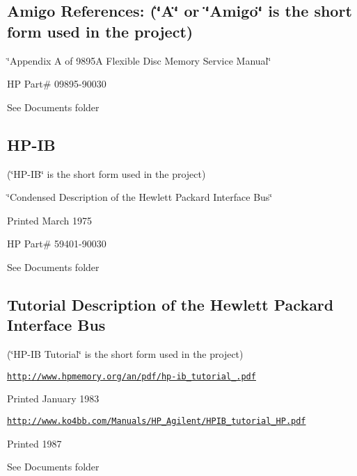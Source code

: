  \subsection*{Amigo References\+: (\char`\"{}\+A\char`\"{} or \char`\"{}\+Amigo\char`\"{} is the short form used in the project)}


\begin{DoxyItemize}
\item \char`\"{}\+Appendix A of 9895\+A Flexible Disc Memory Service Manual\char`\"{}
\item HP Part\# 09895-\/90030
\item See Documents folder
\end{DoxyItemize}



 \subsection*{H\+P-\/\+IB}


\begin{DoxyItemize}
\item (\char`\"{}\+H\+P-\/\+I\+B\char`\"{} is the short form used in the project)
\item \char`\"{}\+Condensed Description of the Hewlett Packard Interface Bus\char`\"{}
\item Printed March 1975
\item HP Part\# 59401-\/90030
\item See Documents folder
\end{DoxyItemize}



 \subsection*{Tutorial Description of the Hewlett Packard Interface Bus}


\begin{DoxyItemize}
\item (\char`\"{}\+H\+P-\/\+I\+B Tutorial\char`\"{} is the short form used in the project)
\item \href{http://www.hpmemory.org/an/pdf/hp-ib_tutorial_1980.pdf}{\tt http\+://www.\+hpmemory.\+org/an/pdf/hp-\/ib\+\_\+tutorial\+\_.\+pdf}
\item Printed January 1983
\item \href{http://www.ko4bb.com/Manuals/HP_Agilent/HPIB_tutorial_HP.pdf}{\tt http\+://www.\+ko4bb.\+com/\+Manuals/\+H\+P\+\_\+\+Agilent/\+H\+P\+I\+B\+\_\+tutorial\+\_\+\+H\+P.\+pdf}
\item Printed 1987
\item See Documents folder
\end{DoxyItemize}



